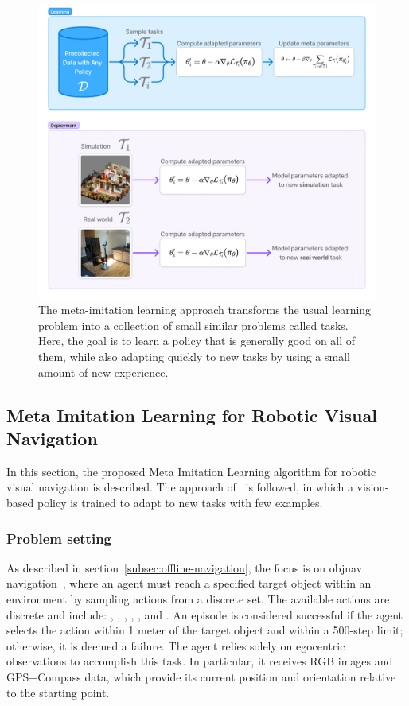 \begin{figure}
    \centering
    \includegraphics[width=0.7\linewidth]{figures/metanav/graphical_abstract}
    \caption{
        The meta-imitation learning approach transforms the usual learning problem into a collection of small similar problems called tasks.
        Here, the goal is to learn a policy that is generally good on all of them, while also adapting quickly to new tasks by using a small amount of new experience.
    }
    \label{fig:abstract_metanav}
\end{figure}

\subsection{Meta Imitation Learning for Robotic Visual Navigation}\label{subsec:meta-imitation-learning-for-robotic-visual-navigation}

In this section, the proposed Meta Imitation Learning algorithm for robotic visual navigation is described.
The approach of~\cite{finnOneShotVisualImitation2017} is followed, in which a vision-based policy is trained to adapt to new tasks with few examples.

\subsubsection{Problem setting}\label{subsubsec:problem-setting}

As described in section~\ref{subsec:offline-navigation}, the focus is on \acrshort{objnav} navigation~\cite{batra2020}, where an agent must reach a specified target object within an environment by sampling actions from a discrete set.
The available actions are discrete and include: \turnleft, \turnright, \moveforward, \lookup, \lookdown, and \stopac.
An episode is considered successful if the agent selects the \stopac action within 1 meter of the target object and within a 500-step limit; otherwise, it is deemed a failure.
The agent relies solely on egocentric observations to accomplish this task.
In particular, it receives RGB images and GPS+Compass data, which provide its current position and orientation relative to the starting point.

